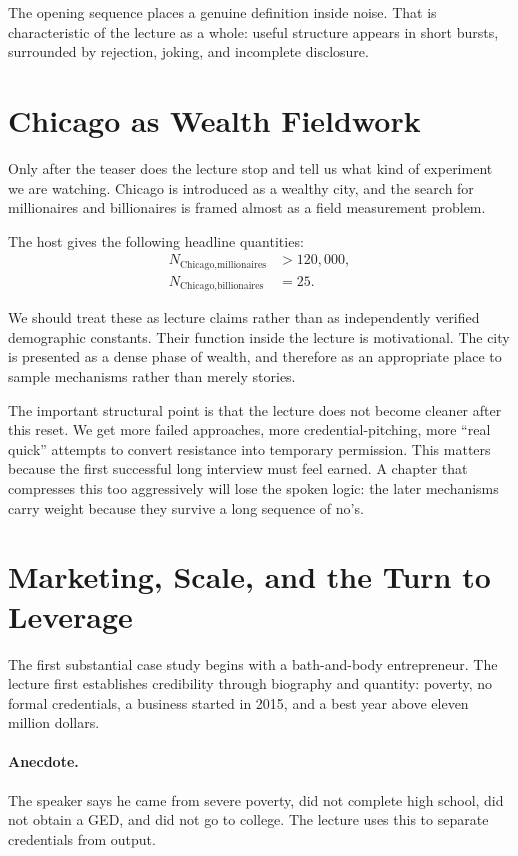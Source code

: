 \begin{remark}
The opening sequence places a genuine definition inside noise. That is characteristic of the lecture as a whole: useful structure appears in short bursts, surrounded by rejection, joking, and incomplete disclosure.
\end{remark}

\section{Chicago as Wealth Fieldwork}

Only after the teaser does the lecture stop and tell us what kind of experiment we are watching. Chicago is introduced as a wealthy city, and the search for millionaires and billionaires is framed almost as a field measurement problem.

The host gives the following headline quantities:
\begin{align}
N_{\text{Chicago,millionaires}} &> 120{,}000,\\
N_{\text{Chicago,billionaires}} &= 25.
\end{align}

We should treat these as lecture claims rather than as independently verified demographic constants. Their function inside the lecture is motivational. The city is presented as a dense phase of wealth, and therefore as an appropriate place to sample mechanisms rather than merely stories.

The important structural point is that the lecture does not become cleaner after this reset. We get more failed approaches, more credential-pitching, more ``real quick'' attempts to convert resistance into temporary permission. This matters because the first successful long interview must feel earned. A chapter that compresses this too aggressively will lose the spoken logic: the later mechanisms carry weight because they survive a long sequence of no's.

\section{Marketing, Scale, and the Turn to Leverage}

The first substantial case study begins with a bath-and-body entrepreneur. The lecture first establishes credibility through biography and quantity: poverty, no formal credentials, a business started in 2015, and a best year above eleven million dollars.

\paragraph{Anecdote.}
The speaker says he came from severe poverty, did not complete high school, did not obtain a GED, and did not go to college. The lecture uses this to separate credentials from output.

